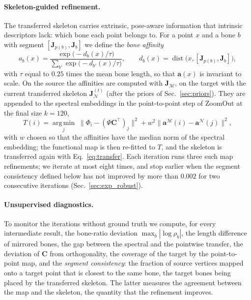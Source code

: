 \documentclass[11pt]{article}
\newcommand{\M}{\mathcal{M}}
\newcommand{\N}{\mathcal{N}}
\newcommand{\J}{\mathbf{J}}
\newcommand{\C}{\mathbf{C}}
\begin{document}
\paragraph{Skeleton-guided refinement.} The transferred skeleton carries
extrinsic, pose-aware information that intrinsic descriptors lack: which
bone each point belongs to. For a point $x$ and a bone $b$ with segment
$[\J_{p(b)}, \J_b]$ we define the \emph{bone affinity}
\begin{equation}
  a_b(x) = \frac{\exp\!\big(-d_b(x)/\tau\big)}{\sum_{b'} \exp\!\big(-d_{b'}(x)/\tau\big)},
  \qquad d_b(x) = \operatorname{dist}\!\big(x, [\J_{p(b)}, \J_b]\big),
\end{equation}
with $\tau$ equal to $0.25$ times the mean bone length, so that $\mathbf{a}(x)$
is invariant to scale. On the source the affinities are computed with
$\J_\M$, on the target with the current transferred skeleton $\J_\N^{(t)}$
(after the priors of Sec.~\ref{sec:priors}). They are appended to the
spectral embeddings in the point-to-point step of ZoomOut at the final size
$k=120$,
\begin{equation}
  T(i) = \operatorname*{arg\,min}_{j} \;\big\|\Phi_i - (\Psi\C^\top)_j\big\|^2 + w^2 \|\mathbf{a}^\M(i) - \mathbf{a}^\N(j)\|^2 ,
\end{equation}
with $w$ chosen so that the affinities have the median norm of the spectral
embedding; the functional map is then re-fitted to $T$, and the skeleton is
transferred again with Eq.~\eqref{eq:transfer}. Each iteration runs three
such map refinements; we iterate at most eight times, and stop earlier when
the segment consistency defined below has not improved by more than $0.002$
for two consecutive iterations (Sec.~\ref{sec:exp_robust}).

\paragraph{Unsupervised diagnostics.} To monitor the iterations without
ground truth we compute, for every intermediate result, the bone-ratio
deviation $\max_b |\log\rho_b|$, the length difference of mirrored bones, the
gap between the spectral and the pointwise transfer, the deviation of $\C$
from orthogonality, the coverage of the target by the point-to-point map, and
the \emph{segment consistency}: the fraction of source vertices mapped onto a
target point that is closest to the same bone, the target bones being placed
by the transferred skeleton. The latter measures the agreement between the map
and the skeleton, the quantity that the refinement improves.
\end{document}
